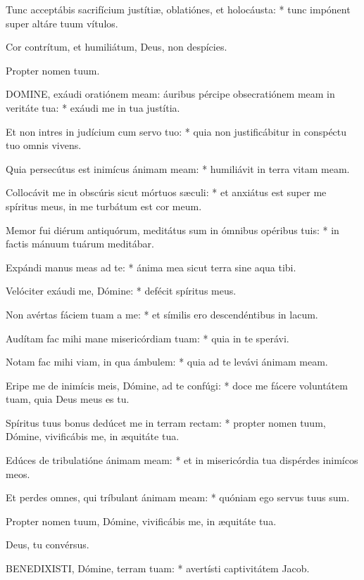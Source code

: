 Tunc acceptábis sacrifícium justítiæ, oblatiónes, et holocáusta: * tunc impónent super altáre tuum vítulos.

 Cor contrítum, et humiliátum, Deus, non despícies.

 Propter nomen tuum.


\lettrine[lines=2]{D}{OMINE}, exáudi oratiónem meam: áuribus pércipe obsecratiónem meam in veritáte tua: * exáudi me in tua justítia.

Et non intres in judícium cum servo tuo: * quia non justificábitur in conspéctu tuo omnis vivens.

Quia persecútus est inimícus ánimam meam: * humiliávit in terra vitam meam.

Collocávit me in obscúris sicut mórtuos sæculi: * et anxiátus est super me spíritus meus, in me turbátum est cor meum.

Memor fui diérum antiquórum, meditátus sum in ómnibus opéribus tuis: * in factis mánuum tuárum meditábar.

Expándi manus meas ad te: * ánima mea sicut terra sine aqua tibi.

Velóciter exáudi me, Dómine: * defécit spíritus meus.

Non avértas fáciem tuam a me: * et símilis ero descendéntibus in lacum.

Audítam fac mihi mane misericórdiam tuam: * quia in te sperávi.

Notam fac mihi viam, in qua ámbulem: * quia ad te levávi ánimam meam.

Eripe me de inimícis meis, Dómine, ad te confúgi: * doce me fácere voluntátem tuam, quia Deus meus es tu.

Spíritus tuus bonus dedúcet me in terram rectam: * propter nomen tuum, Dómine, vivificábis me, in æquitáte tua.

Edúces de tribulatióne ánimam meam: * et in misericórdia tua dispérdes inimícos meos.

Et perdes omnes, qui tríbulant ánimam meam: * quóniam ego servus tuus sum.

 Propter nomen tuum, Dómine, vivificábis me, in æquitáte tua.

 Deus, tu convérsus.


\lettrine[lines=2]{B}{ENEDIXISTI}, Dómine, terram tuam: * avertísti captivitátem Jacob.

